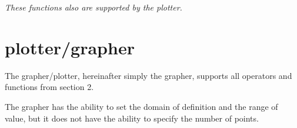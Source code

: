 \documentclass[12pt, a4paper]{article}
\begin{document}
\textit{These functions also are supported by the plotter.}

\pagebreak

\section{plotter/grapher}

The grapher/plotter, hereinafter simply the grapher, supports all operators and functions from section 2.

The grapher has the ability to set the domain of definition and the range of value, but it does not have the ability to specify the number of points.
\end{document}
